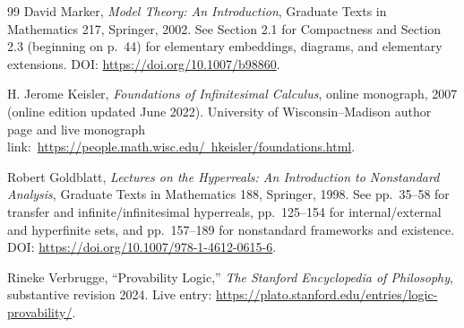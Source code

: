 \documentclass[11pt,openany]{book}
\theoremstyle{definition}
\theoremstyle{remark}
\begin{document}
\begin{thebibliography}{99}
David Marker,
\emph{Model Theory: An Introduction}, Graduate Texts in Mathematics 217, Springer, 2002.
See Section 2.1 for Compactness and Section 2.3 (beginning on p.~44) for elementary embeddings, diagrams, and elementary extensions.
DOI: \href{https://doi.org/10.1007/b98860}{https://doi.org/10.1007/b98860}.

H. Jerome Keisler,
\emph{Foundations of Infinitesimal Calculus}, online monograph, 2007 (online edition updated June 2022).
University of Wisconsin--Madison author page and live monograph link:\
\href{https://people.math.wisc.edu/~hkeisler/foundations.html}{https://people.math.wisc.edu/~hkeisler/foundations.html}.

Robert Goldblatt,
\emph{Lectures on the Hyperreals: An Introduction to Nonstandard Analysis}, Graduate Texts in Mathematics 188, Springer, 1998.
See pp.~35--58 for transfer and infinite/infinitesimal hyperreals, pp.~125--154 for internal/external and hyperfinite sets, and pp.~157--189 for nonstandard frameworks and existence.
DOI: \href{https://doi.org/10.1007/978-1-4612-0615-6}{https://doi.org/10.1007/978-1-4612-0615-6}.

Rineke Verbrugge,
``Provability Logic,'' \emph{The Stanford Encyclopedia of Philosophy}, substantive revision 2024.
Live entry: \href{https://plato.stanford.edu/entries/logic-provability/}{https://plato.stanford.edu/entries/logic-provability/}.

\end{thebibliography}
\end{document}
